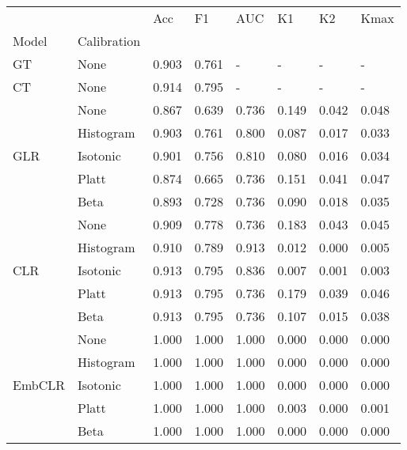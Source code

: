 \begin{tabular}{llllllll}
\toprule
 &  & Acc & F1 & AUC & K1 & K2 & Kmax \\
Model & Calibration &  &  &  &  &  &  \\
\midrule
GT & None & 0.903 & 0.761 & - & - & - & - \\
\cline{1-8}
CT & None & 0.914 & 0.795 & - & - & - & - \\
\cline{1-8}
\multirow[t]{5}{*}{GLR} & None & 0.867 & 0.639 & 0.736 & 0.149 & 0.042 & 0.048 \\
 & Histogram & 0.903 & 0.761 & 0.800 & 0.087 & 0.017 & 0.033 \\
 & Isotonic & 0.901 & 0.756 & 0.810 & 0.080 & 0.016 & 0.034 \\
 & Platt & 0.874 & 0.665 & 0.736 & 0.151 & 0.041 & 0.047 \\
 & Beta & 0.893 & 0.728 & 0.736 & 0.090 & 0.018 & 0.035 \\
\cline{1-8}
\multirow[t]{5}{*}{CLR} & None & 0.909 & 0.778 & 0.736 & 0.183 & 0.043 & 0.045 \\
 & Histogram & 0.910 & 0.789 & 0.913 & 0.012 & 0.000 & 0.005 \\
 & Isotonic & 0.913 & 0.795 & 0.836 & 0.007 & 0.001 & 0.003 \\
 & Platt & 0.913 & 0.795 & 0.736 & 0.179 & 0.039 & 0.046 \\
 & Beta & 0.913 & 0.795 & 0.736 & 0.107 & 0.015 & 0.038 \\
\cline{1-8}
\multirow[t]{5}{*}{EmbCLR} & None & 1.000 & 1.000 & 1.000 & 0.000 & 0.000 & 0.000 \\
 & Histogram & 1.000 & 1.000 & 1.000 & 0.000 & 0.000 & 0.000 \\
 & Isotonic & 1.000 & 1.000 & 1.000 & 0.000 & 0.000 & 0.000 \\
 & Platt & 1.000 & 1.000 & 1.000 & 0.003 & 0.000 & 0.001 \\
 & Beta & 1.000 & 1.000 & 1.000 & 0.000 & 0.000 & 0.000 \\
\cline{1-8}
\bottomrule
\end{tabular}
